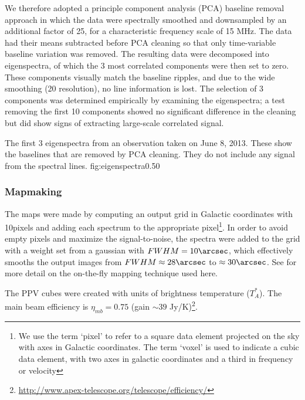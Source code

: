 We therefore adopted a principle component analysis (PCA) baseline removal
approach in which the data were spectrally smoothed and downsampled by an
additional factor of 25, for a characteristic frequency scale of 15 MHz.  The
data had their means subtracted before PCA cleaning so that only time-variable
baseline variation was removed.  The resulting data were decomposed into
eigenspectra, of which the 3 most correlated components were then set to zero.
These components visually match the baseline ripples, and due to the wide
smoothing (20 \kms resolution), no line information is lost.  The selection of
3 components was determined empirically by examining the eigenspectra; a test
removing the first 10 components showed no significant difference in the
cleaning but did show signs of extracting large-scale correlated signal.

{The first 3 eigenspectra from an observation taken on June 8, 2013.  These
show the baselines that are removed by PCA cleaning.  They do not include any
signal from the spectral lines.  }
{fig:eigenspectra}{0.5}{0}


\subsubsection{Mapmaking}
The maps were made by computing an output grid in Galactic coordinates with
10\arcsec pixels and adding each spectrum to the appropriate pixel\footnote{We
use the term `pixel' to refer to a square data element projected on the sky
with axes in Galactic coordinates.  The term `voxel' is used to indicate a cubic data
element, with two axes in galactic coordinates and a third in frequency or
velocity}.  In order
to avoid empty pixels and maximize the signal-to-noise, the spectra were added
to the grid with a weight set from a gaussian with $FWHM=10\arcsec$, which
effectively smooths the output images from $FWHM\approx28\arcsec$ to
$\approx30\arcsec$.  See \citet{Mangum2007a} for more detail on the on-the-fly
mapping technique used here.


The PPV cubes were created with units of brightness temperature ($T_A^*$).  The
main beam efficiency is $\eta_{mb} = 0.75$ (gain $\sim39$
Jy/K)\footnote{\url{http://www.apex-telescope.org/telescope/efficiency/}}.


